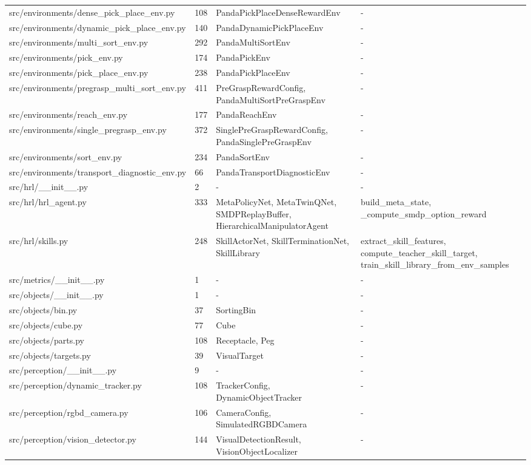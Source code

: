 \documentclass[11pt,a4paper,oneside]{book}
\begin{document}
\begin{longtable}{l l l l}
src/environments/dense\_pick\_place\_env.py & 108 & PandaPickPlaceDenseRewardEnv & - \\
src/environments/dynamic\_pick\_place\_env.py & 140 & PandaDynamicPickPlaceEnv & - \\
src/environments/multi\_sort\_env.py & 292 & PandaMultiSortEnv & - \\
src/environments/pick\_env.py & 174 & PandaPickEnv & - \\
src/environments/pick\_place\_env.py & 238 & PandaPickPlaceEnv & - \\
src/environments/pregrasp\_multi\_sort\_env.py & 411 & PreGraspRewardConfig, PandaMultiSortPreGraspEnv & - \\
src/environments/reach\_env.py & 177 & PandaReachEnv & - \\
src/environments/single\_pregrasp\_env.py & 372 & SinglePreGraspRewardConfig, PandaSinglePreGraspEnv & - \\
src/environments/sort\_env.py & 234 & PandaSortEnv & - \\
src/environments/transport\_diagnostic\_env.py & 66 & PandaTransportDiagnosticEnv & - \\
src/hrl/\_\_init\_\_.py & 2 & - & - \\
src/hrl/hrl\_agent.py & 333 & MetaPolicyNet, MetaTwinQNet, SMDPReplayBuffer, HierarchicalManipulatorAgent & build\_meta\_state, \_compute\_smdp\_option\_reward \\
src/hrl/skills.py & 248 & SkillActorNet, SkillTerminationNet, SkillLibrary & extract\_skill\_features, compute\_teacher\_skill\_target, train\_skill\_library\_from\_env\_samples \\
src/metrics/\_\_init\_\_.py & 1 & - & - \\
src/objects/\_\_init\_\_.py & 1 & - & - \\
src/objects/bin.py & 37 & SortingBin & - \\
src/objects/cube.py & 77 & Cube & - \\
src/objects/parts.py & 108 & Receptacle, Peg & - \\
src/objects/targets.py & 39 & VisualTarget & - \\
src/perception/\_\_init\_\_.py & 9 & - & - \\
src/perception/dynamic\_tracker.py & 108 & TrackerConfig, DynamicObjectTracker & - \\
src/perception/rgbd\_camera.py & 106 & CameraConfig, SimulatedRGBDCamera & - \\
src/perception/vision\_detector.py & 144 & VisualDetectionResult, VisionObjectLocalizer & - \\

\end{longtable}
\end{document}

